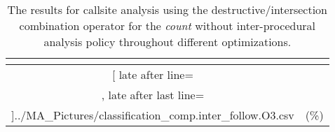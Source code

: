 \begin{table}[!htbp]
{\begin{tabular}{|c|c}
\multicolumn{1}{c}{}
	\\\midrule
	\csvreader[ late after line=\\, late after last line=\\\bottomrule]{../MA_Pictures/classification_comp.inter_follow.O3.csv}{
}
	{\csvcoliv (\csvcolv \%) & \csvcolvi (\csvcolvii\%)}%


    	\end{tabular}
}
		\caption {The results for callsite analysis using the destructive/intersection combination operator for the \textit{count} without inter-procedural analysis policy throughout different optimizations.}
		\label{tbl:CSdestinterCOUNTnointer}
\end{table}


